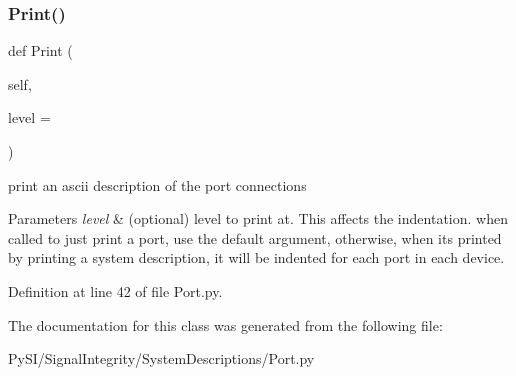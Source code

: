 \subsubsection{\texorpdfstring{Print()}{Print()}}
{\footnotesize\ttfamily def Print (\begin{DoxyParamCaption}\item[{}]{self,  }\item[{}]{level = {} }\end{DoxyParamCaption})}



print an ascii description of the port connections 


\begin{DoxyParams}{Parameters}
{\em level} & (optional) level to print at. This affects the indentation. when called to just print a port, use the default argument, otherwise, when it\textquotesingle{}s printed by printing a system description, it will be indented for each port in each device. \\
\hline
\end{DoxyParams}


Definition at line 42 of file Port.\+py.



The documentation for this class was generated from the following file\+:\begin{DoxyCompactItemize}
\item 
Py\+S\+I/\+Signal\+Integrity/\+System\+Descriptions/Port.\+py\end{DoxyCompactItemize}
